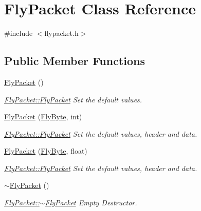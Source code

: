 \hypertarget{class_fly_packet}{}\section{Fly\+Packet Class Reference}
\label{class_fly_packet}


{\ttfamily \#include $<$flypacket.\+h$>$}

\subsection*{Public Member Functions}
\begin{DoxyCompactItemize}
\item 
\hyperlink{class_fly_packet_aca19954f7e01d839b5759245a9950d57}{Fly\+Packet} ()
\begin{DoxyCompactList}\small\item\em \hyperlink{class_fly_packet_aca19954f7e01d839b5759245a9950d57}{Fly\+Packet\+::\+Fly\+Packet} Set the default values. \end{DoxyCompactList}\item 
\hyperlink{class_fly_packet_ac6a9ad5c29755d32ae52bb3526563d79}{Fly\+Packet} (\hyperlink{conversions_8h_a1f006e31a957accfe6aa1bf6f401efce}{Fly\+Byte}, int)
\begin{DoxyCompactList}\small\item\em \hyperlink{class_fly_packet_aca19954f7e01d839b5759245a9950d57}{Fly\+Packet\+::\+Fly\+Packet} Set the default values, header and data. \end{DoxyCompactList}\item 
\hyperlink{class_fly_packet_a24c7957a841f24405f26ceb918e15a04}{Fly\+Packet} (\hyperlink{conversions_8h_a1f006e31a957accfe6aa1bf6f401efce}{Fly\+Byte}, float)
\begin{DoxyCompactList}\small\item\em \hyperlink{class_fly_packet_aca19954f7e01d839b5759245a9950d57}{Fly\+Packet\+::\+Fly\+Packet} Set the default values, header and data. \end{DoxyCompactList}\item 
\hyperlink{class_fly_packet_a58a219b0a59c413237eea53dc6231fcf}{$\sim$\+Fly\+Packet} ()
\begin{DoxyCompactList}\small\item\em \hyperlink{class_fly_packet_a58a219b0a59c413237eea53dc6231fcf}{Fly\+Packet\+::$\sim$\+Fly\+Packet} Empty Destructor. \end{DoxyCompactList}\item 

\end{DoxyCompactItemize}
